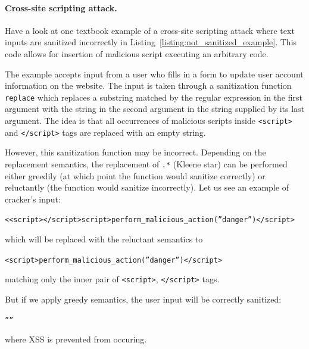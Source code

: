 \paragraph{Cross-site scripting attack.}
Have a look at one textbook example of a cross-site scripting attack where text inputs are sanitized incorrectly in Listing~\ref{listing:not_sanitized_example}.
This code allows for insertion of malicious script executing an arbitrary code.

The example accepts input from a user who fills in a form to update user account information on the website.
The input is taken through a sanitization function \texttt{replace} which replaces a substring matched by the regular expression in the first argument with the string in the second argument in the string supplied by its last argument.
The idea is that all occurrences of malicious scripts inside \texttt{<script>} and \texttt{</script>} tags are replaced with an empty string.

However, this sanitization function may be incorrect.
Depending on the replacement semantics, the replacement of \texttt{.*} (Kleene star) can be performed either greedily (at which point the function would sanitize correctly) or reluctantly (the function would sanitize incorrectly).
Let us see an example of cracker's input:
\begin{center}
 \texttt{<<script></script>script>perform\_malicious\_action(''danger'')</script>}
\end{center}
which will be replaced with the reluctant semantics to
\begin{center}
 \texttt{<script>perform\_malicious\_action(''danger'')</script>}
\end{center}

matching only the inner pair of \texttt{<script>}, \texttt{</script>} tags.

But if we apply greedy semantics, the user input will be correctly sanitized:
\begin{center}
 \texttt{''''}
\end{center}
where XSS is prevented from occuring.

